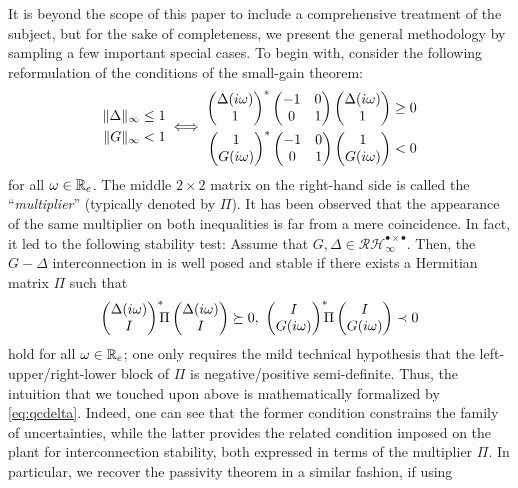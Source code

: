It is beyond the scope of this paper to include a comprehensive treatment of the subject, but for the 
sake of completeness, we present the general methodology by sampling a few important special cases. 
To begin with, consider the following reformulation of the conditions of the small-gain theorem:
\begin{equation}
\begin{aligned}
\|\Delta\|_\infty &\leq 1\\
\|G\|_\infty &< 1
\end{aligned} \iff
{\scriptstyle \begin{aligned}
\begin{pmatrix}\Delta(i\omega)\\1\end{pmatrix}^*\begin{pmatrix}-1 &0\\0 &1\end{pmatrix}\begin{pmatrix}\Delta(i\omega)\\1\end{pmatrix} &\geq 0\\
\begin{pmatrix}1\\G(i\omega)\end{pmatrix}^*\begin{pmatrix}-1 &0\\0 &1\end{pmatrix}\begin{pmatrix}1\\G(i\omega)\end{pmatrix} &< 0
\end{aligned}}
\label{eq:smqf}
\end{equation}
for all $\omega\in\mathbb{R}_e$. The middle {$2\times2$ matrix} on the right-hand side is called the 
``\emph{multiplier}'' (typically denoted by $\Pi$). It has been observed that the appearance of the 
same multiplier on both inequalities is far from a mere coincidence. In fact, it led to the following 
stability test: Assume that $G,\Delta\in \mathcal{RH}^{\bullet \times \bullet}_\infty$. Then, the 
$G-\Delta$ interconnection {in } is well posed and stable if there exists a 
Hermitian matrix $\Pi$ such that
\begin{equation}
\begin{pmatrix}\Delta(i\omega)\\I\end{pmatrix}^*\!\!\!\Pi\begin{pmatrix}\Delta(i\omega)\\I\end{pmatrix} \succeq 0,\
\begin{pmatrix}I\\G(i\omega)\end{pmatrix}^*\!\!\!\Pi\begin{pmatrix}I\\G(i\omega)\end{pmatrix} \prec 0  \label{eq:qcdelta}
\end{equation}
hold for all $\omega\in\mathbb{R}_e$; one only requires the mild technical hypothesis that the left-upper/right-lower 
block of $\Pi$ is negative/positive semi-definite. Thus, the intuition that we touched upon above is mathematically 
formalized by \eqref{eq:qcdelta}. Indeed, one can see that the former condition constrains the family of uncertainties,
 while the latter {provides the related condition} imposed on the plant for interconnection stability, both expressed 
in terms of the multiplier $\Pi$. In particular, we recover the passivity theorem in a similar fashion, if {using} 
